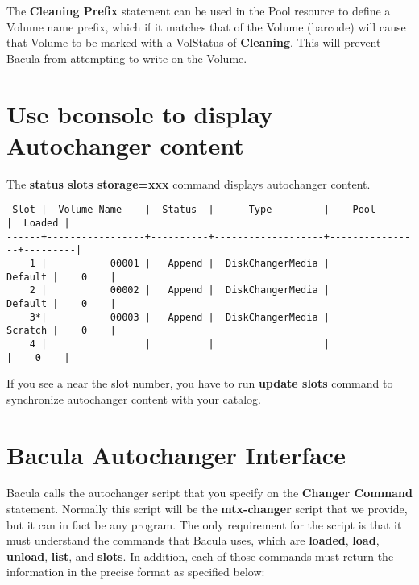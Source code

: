 The {\bf Cleaning Prefix} statement can be used in the Pool resource to define
a Volume name prefix, which if it matches that of the Volume (barcode) will
cause that Volume to be marked with a VolStatus of {\bf Cleaning}. This will
prevent Bacula from attempting to write on the Volume.

\section{Use bconsole to display Autochanger content}

The {\bf status slots storage=xxx} command displays autochanger content.

\footnotesize
\begin{verbatim}
 Slot |  Volume Name    |  Status  |      Type         |    Pool        |  Loaded |
------+-----------------+----------+-------------------+----------------+---------|
    1 |           00001 |   Append |  DiskChangerMedia |        Default |    0    |
    2 |           00002 |   Append |  DiskChangerMedia |        Default |    0    |
    3*|           00003 |   Append |  DiskChangerMedia |        Scratch |    0    |
    4 |                 |          |                   |                |    0    |
\end{verbatim}
\normalsize

If you see a {\bf *} near the slot number, you have to run {\bf update slots}
command to synchronize autochanger content with your catalog.

\label{interface}

\section{Bacula Autochanger Interface}

Bacula calls the autochanger script that you specify on the {\bf Changer
Command} statement. Normally this script will be the {\bf mtx-changer} script
that we provide, but it can in fact be any program. The only requirement
for the script is that it must understand the commands that
Bacula uses, which are {\bf loaded}, {\bf load}, {\bf
unload}, {\bf list}, and {\bf slots}. In addition,
each of those commands must return the information in the precise format as
specified below: 

